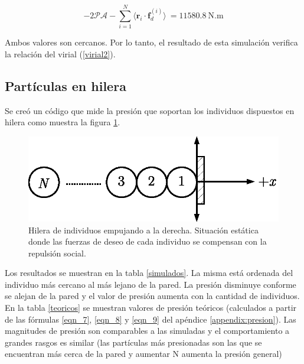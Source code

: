 \begin{equation}
 -2\mathcal{PA} -\displaystyle\sum_{i=1}^N \langle
\mathbf{r}_i\cdot\mathbf{f}_d^{(i)}\rangle\ =  11580.8\ \text{N.m}
\end{equation}

Ambos valores son cercanos. Por lo tanto, el resultado de esta simulación verifica la relación del virial (\ref{virial2}).


\subsection{Partículas en hilera}

Se creó un código que mide la presión que soportan los individuos dispuestos en hilera como muestra la figura \ref{hilera}.  

\begin{figure}[!htbp]
\center
\includegraphics[scale=1]{figuras/hilera.eps}
\caption[width=5cm]{Hilera de individuos empujando a la derecha. Situación estática donde las fuerzas de deseo de cada individuo se compensan con la repulsión social.}
\label{hilera}
\end{figure}

Los resultados se muestran en la tabla \ref{simulados}. La misma está ordenada del individuo más cercano al más lejano de la pared. La presión disminuye conforme se alejan de la pared y el valor de presión aumenta con la cantidad de individuos.\\
En la tabla \ref{teoricos} se muestran valores de presión teóricos (calculados a partir de las fórmulas \ref{eqn_7}, \ref{eqn_8} y \ref{eqn_9} del apéndice \ref{appendix:presion}). Las magnitudes de presión son comparables a las simuladas y el comportamiento a grandes rasgos es similar (las partículas más presionadas son las que se encuentran más cerca de la pared y aumentar N aumenta la presión general)  


